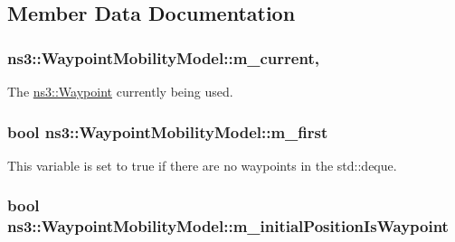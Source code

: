 \subsection{Member Data Documentation}
\subsubsection[{\texorpdfstring{m\+\_\+current}{m_current}}]{ ns3\+::\+Waypoint\+Mobility\+Model\+::m\+\_\+current\hspace{0.3cm}{\ttfamily [mutable]}, {\ttfamily [private]}}\hypertarget{classns3_1_1WaypointMobilityModel_a8705ba992cf7e115c7f567393d7a6912}{}\label{classns3_1_1WaypointMobilityModel_a8705ba992cf7e115c7f567393d7a6912}


The \hyperlink{classns3_1_1Waypoint}{ns3\+::\+Waypoint} currently being used. 

\subsubsection[{\texorpdfstring{m\+\_\+first}{m_first}}]{\setlength{\rightskip}{0pt plus 5cm}bool ns3\+::\+Waypoint\+Mobility\+Model\+::m\+\_\+first\hspace{0.3cm}{\ttfamily [private]}}\hypertarget{classns3_1_1WaypointMobilityModel_a878ef6945bf7a2346386ee1710234331}{}\label{classns3_1_1WaypointMobilityModel_a878ef6945bf7a2346386ee1710234331}


This variable is set to true if there are no waypoints in the std\+::deque. 

\subsubsection[{\texorpdfstring{m\+\_\+initial\+Position\+Is\+Waypoint}{m_initialPositionIsWaypoint}}]{\setlength{\rightskip}{0pt plus 5cm}bool ns3\+::\+Waypoint\+Mobility\+Model\+::m\+\_\+initial\+Position\+Is\+Waypoint\hspace{0.3cm}{\ttfamily [private]}}\hypertarget{classns3_1_1WaypointMobilityModel_a3db9542bf052bb86a2e335661016f352}{}\label{classns3_1_1WaypointMobilityModel_a3db9542bf052bb86a2e335661016f352}


